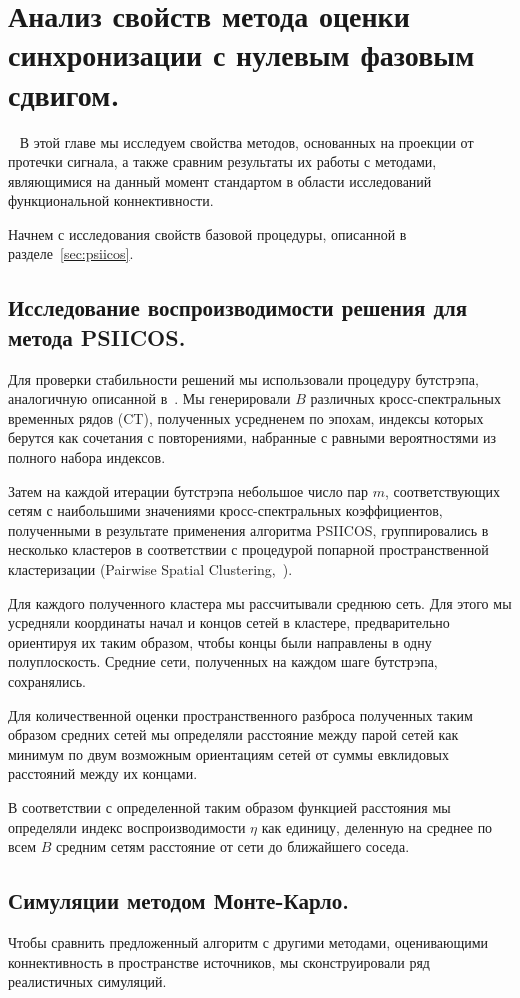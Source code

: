 \chapter{Анализ свойств метода оценки синхронизации с нулевым фазовым сдвигом.}~\label{chapt3}
В этой главе мы исследуем свойства методов, основанных на проекции от протечки сигнала,
а также сравним результаты их работы с методами, являющимися на данный
момент стандартом в области исследований функциональной коннективности.

Начнем с исследования свойств базовой процедуры, описанной в разделе~\ref{sec:psiicos}.
\section{Исследование воспроизводимости решения для метода PSIICOS.}\label{sec:bootstrap}

Для проверки стабильности решений мы использовали процедуру бутстрэпа, аналогичную
описанной в~\cite{Darvas2005}.
Мы генерировали $B$ различных кросс-спектральных временных рядов (CT), полученных
усредненем по эпохам, индексы которых берутся как сочетания с повторениями, набранные
с равными вероятностями из полного набора индексов.

Затем на каждой итерации бутстрэпа небольшое
число пар $m$, соответствующих сетям с наибольшими
значениями кросс-спектральных коэффициентов, полученными в результате применения
алгоритма PSIICOS, группировались в несколько кластеров в соответствии с процедурой
попарной пространственной кластеризации (Pairwise Spatial Clustering,~\cite{Zalesky2012}).

Для каждого полученного кластера мы рассчитывали среднюю сеть. Для этого мы усредняли
координаты начал и концов сетей в кластере, предварительно ориентируя их таким
образом, чтобы концы были направлены в одну полуплоскость.
Средние сети, полученных на каждом шаге бутстрэпа, сохранялись.

Для количественной оценки пространственного разброса полученных таким образом средних сетей
мы определяли расстояние между парой сетей как минимум по двум возможным ориентациям
сетей от суммы евклидовых расстояний между их концами.

В соответствии с определенной таким образом функцией расстояния мы определяли индекс
воспроизводимости $\eta$ как единицу, деленную на среднее по всем $B$ средним сетям расстояние
от сети до ближайшего соседа.

\section{Симуляции методом Монте-Карло.}\label{sec:monte_carlo_simulation}
Чтобы сравнить предложенный алгоритм с другими методами, оценивающими коннективность
в пространстве источников, мы сконструировали ряд реалистичных симуляций.

